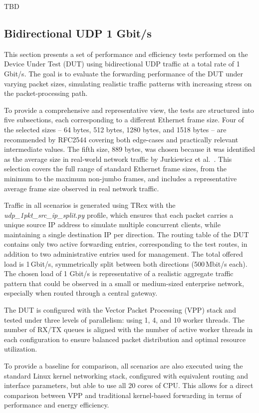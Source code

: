 TBD
\subsection{Bidirectional UDP 1 Gbit/s}
This section presents a set of performance and efficiency tests performed on the Device Under Test (DUT) using bidirectional UDP traffic at a total rate of 1\,Gbit/s. 
The goal is to evaluate the forwarding performance of the DUT under varying packet sizes, simulating realistic traffic patterns with increasing stress on the packet-processing path.

To provide a comprehensive and representative view, the tests are structured into five subsections, each corresponding to a different Ethernet frame size. 
Four of the selected sizes -- 64 bytes, 512 bytes, 1280 bytes, and 1518 bytes -- are recommended by RFC2544\cite{rfc2544} 
covering both edge-cases and practically relevant intermediate values. 
The fifth size, 889 bytes, was chosen because it was identified as the average size in real-world network traffic by Jurkiewicz et al.~\cite{JURKIEWICZ202115}. 
This selection covers the full range of standard Ethernet frame sizes, from the minimum to the maximum non-jumbo frames, 
and includes a representative average frame size observed in real network traffic.

Traffic in all scenarios is generated using TRex with the \textit{udp\_1pkt\_src\_ip\_split.py} profile, 
which ensures that each packet carries a unique source IP address to simulate multiple concurrent clients, while maintaining a single destination IP per direction. 
The routing table of the DUT contains only two active forwarding entries, corresponding to the test routes, in addition to two administrative entries used for management.
The total offered load is 1\,Gbit/s, symmetrically split between both directions (500\,Mbit/s each).
The chosen load of 1 Gbit/s is representative of a realistic aggregate traffic pattern that could be observed in a small or medium-sized enterprise network, especially when routed through a central gateway.

The DUT is configured with the Vector Packet Processing (VPP) stack and tested under three levels of parallelism: using 1, 4, and 10 worker threads. 
The number of RX/TX queues is aligned with the number of active worker threads in each configuration to ensure balanced packet distribution and optimal resource utilization.

To provide a baseline for comparison, all scenarios are also executed using the standard Linux kernel networking stack, 
configured with equivalent routing and interface parameters, but able to use all 20 cores of CPU. 
This allows for a direct comparison between VPP and traditional kernel-based forwarding in terms of performance and energy efficiency.

